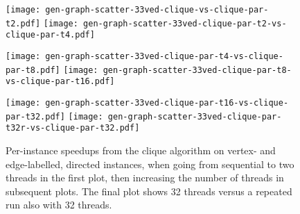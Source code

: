 \documentclass[sigconf]{acmart}
\begin{document}
% 
% 
% 
% 
\begin{figure}[tb]
    \texttt{[image: gen-graph-scatter-33ved-clique-vs-clique-par-t2.pdf]}
    \hfill
    \texttt{[image: gen-graph-scatter-33ved-clique-par-t2-vs-clique-par-t4.pdf]}

    \vspace*{1em}

    \texttt{[image: gen-graph-scatter-33ved-clique-par-t4-vs-clique-par-t8.pdf]}
    \hfill
    \texttt{[image: gen-graph-scatter-33ved-clique-par-t8-vs-clique-par-t16.pdf]}

    \vspace*{1em}

    \texttt{[image: gen-graph-scatter-33ved-clique-par-t16-vs-clique-par-t32.pdf]}
    \hfill
    \texttt{[image: gen-graph-scatter-33ved-clique-par-t32r-vs-clique-par-t32.pdf]}

    \caption{Per-instance speedups from the clique algorithm on vertex- and edge-labelled, directed
    instances, when going from sequential to two threads in the first plot, then increasing the
    number of threads in subsequent plots. The final plot shows 32 threads versus a repeated run
    also with 32 threads.}
\end{figure}
% 
\end{document}

